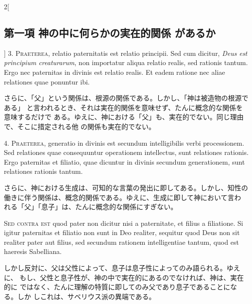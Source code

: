 \documentclass[paper=a4paper,fontsize=10pt,jafontsize=9pt,titlepage]{jlreq}
\begin{document}
\begin{paracol}{2}[\subsection{第一項 神の中に何らかの実在的関係 があるか}]
3. {\scshape Praeterea}, relatio paternitatis est relatio principii. Sed cum
dicitur, {\itshape Deus est principium creaturarum}, non importatur aliqua
relatio realis, sed rationis tantum. Ergo nec paternitas in divinis est relatio
realis. Et eadem ratione nec aliae relationes quae ponuntur ibi.


\switchcolumn


さらに、「父」という関係は、根源の関係である。しかし、「神は被造物の根源である」
 と言われるとき、それは実在的関係を意味せず、たんに概念的な関係を意味するだけで
 ある。ゆえに、神における「父」も、実在的でない。同じ理由で、そこに措定される他
 の関係も実在的でない。




4. {\scshape Praeterea}, generatio in divinis est secundum intelligibilis verbi
processionem. Sed relationes quae consequuntur operationem intellectus,
sunt relationes rationis. Ergo paternitas et filiatio, quae dicuntur in
divinis secundum generationem, sunt relationes rationis tantum.


\switchcolumn


さらに、神における生成は、可知的な言葉の発出に即してある。しかし、知性の
 働きに伴う関係は、概念的関係である。ゆえに、生成に即して神において言わ
 れる「父」「息子」は、たんに概念的な関係にすぎない。


\switchcolumn*[\subsection{s.c.}]


{\scshape Sed contra est} quod pater non dicitur nisi a paternitate, et filius a
filiatione. Si igitur paternitas et filiatio non sunt in Deo realiter,
sequitur quod Deus non sit realiter pater aut filius, sed secundum
rationem intelligentiae tantum, quod est haeresis Sabelliana.


\switchcolumn


しかし反対に、父は父性によって、息子は息子性によってのみ語られる。ゆえに、
 もし、父性と息子性が、神の中で実在的にあるのでなければ、神は、実在的に
ではなく、たんに理解の特質に即してのみ父であり息子であることになる。しか
 しこれは、サベリウス派の異端である。





\end{paracol}
\end{document}
